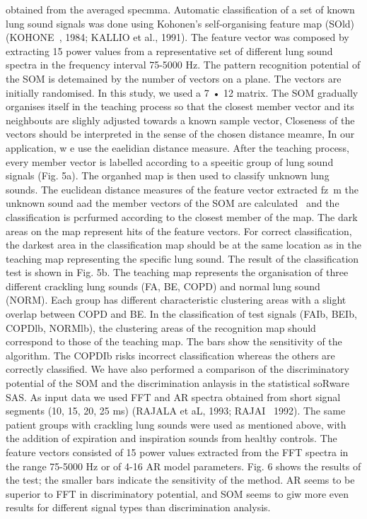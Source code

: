 obtained from the averaged specmma.
Automatic classification of a set of known lung sound
signals was done using Kohonen's self-organising feature map
(SOld) (KOHONE~, 1984; KALLIO et al., 1991). The feature
vector was composed by extracting 15 power values from a
representative set of different lung sound spectra in the
frequency interval 75-5000 Hz. The pattern recognition
potential of the SOM is detemained by the number of vectors
on a plane. The vectors are initially randomised. In this study,
we used a 7 • 12 matrix. The SOM gradually organises itself
in the teaching process so that the closest member vector and
its neighbouts are slighly adjusted towards a known sample
vector, Closeness of the vectors should be interpreted in the
sense of the chosen distance meamre, In our application, w e
use the eaelidian distance measure. After the teaching process,
every member vector is labelled according to a speeitic group
of lung sound signals (Fig. 5a). The organhed map is then used
to classify unknown lung sounds. The euclidean distance
measures of the feature vector extracted fz~m the unknown
sound aad the member vectors of the SOM are calculated~ and
the classification is pcrfurmed according to the closest member
of the map. The dark areas on the map represent hits of the
feature vectors. For correct classification, the darkest area in the
classification map should be at the same location as in the
teaching map representing the specific lung sound.
The result of the classification test is shown in Fig. 5b. The
teaching map represents the organisation of three different
crackling lung sounds (FA, BE, COPD) and normal lung sound
(NORM). Each group has different characteristic clustering
areas with a slight overlap between COPD and BE. In the
classification of test signals (FAIb, BEIb, COPDlb,
NORMlb), the clustering areas of the recognition map should
correspond to those of the teaching map. The bars show the
sensitivity of the algorithm. The COPDIb risks incorrect
classification whereas the others are correctly classified.
We have also performed a comparison of the discriminatory
potential of the SOM and the discrimination anlaysis in the
statistical soRware SAS. As input data we used FFT and AR
spectra obtained from short signal segments (10, 15, 20, 25 ms)
(RAJALA et aL, 1993; RAJAI~ 1992). The same patient groups
with crackling lung sounds were used as mentioned above, with
the addition of expiration and inspiration sounds from healthy
controls. The feature vectors consisted of 15 power values
extracted from the FFT spectra in the range 75-5000 Hz or of
4-16 AR model parameters. Fig. 6 shows the results of the test;
the smaller bars indicate the sensitivity of the method. AR
seems to be superior to FFT in discriminatory potential, and
SOM seems to giw more even results for different signal types
than discrimination analysis.


